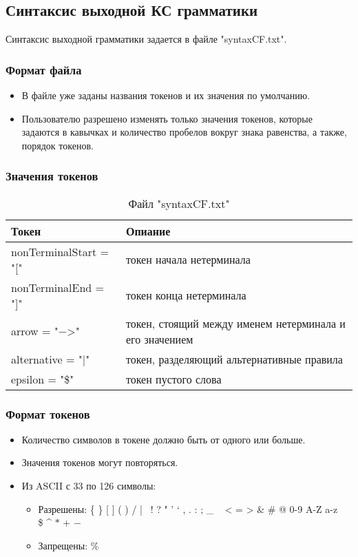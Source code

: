 \documentclass[12pt]{article}
\begin{document}
    \subsection{Синтаксис выходной КС грамматики}

    Синтаксис выходной грамматики задается в файле "syntaxCF.txt".

    \subsubsection*{Формат файла}
    \begin{itemize}
        \item В файле уже заданы названия токенов и их значения по умолчанию.
        \item Пользователю разрешено изменять только значения токенов, которые задаются в кавычках и количество пробелов вокруг знака равенства, а также, порядок токенов.
    \end{itemize}

    \subsubsection*{Значения токенов}
    \begin{table}[hbt!]
        \begin{tabular}{|l|l|}
            \hline
            Токен & Опиание \\
            \hline
            nonTerminalStart = "[" & токен начала нетерминала \\
            nonTerminalEnd = "]" & токен конца нетерминала \\
            arrow = "$-$>" & токен, стоящий между именем нетерминала и его значением \\
            alternative = "$|$" & токен, разделяющий альтернативные правила \\
            epsilon = "\$" & токен пустого слова \\
            \hline
        \end{tabular}
        \caption{Файл "syntaxCF.txt"}
    \end{table}

    \subsubsection*{Формат токенов}
    \begin{itemize}
        \item Количество символов в токене должно быть от одного или больше.
        \item Значения токенов могут повторяться.
        \item Из ASCII с 33 по 126 символы:
        \begin{itemize}
            \item Разрешены:   \{ \} [ ] ( ) / | \ ! ? " ' ` , . : ; \_ ~ < = > \& \# @ 0-9 A-Z a-z\\ \$ \^{} $\ast$ + $-$
            \item Запрещены:  \%
        \end{itemize}
    \end{itemize}
\end{document}
